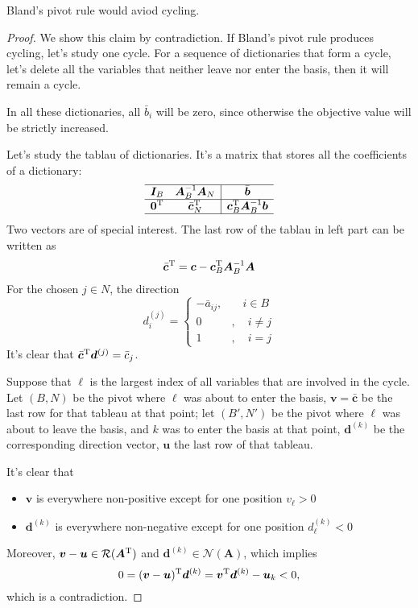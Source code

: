 \begin{theorem}
Bland's pivot rule would aviod cycling.
\end{theorem}
\begin{proof}
We show this claim by contradiction. If Bland's pivot rule produces cycling, let's study one cycle. For a sequence of dictionaries that form a cycle, let's delete all the variables that neither leave nor enter the basis, then it will remain a cycle.

In all these dictionaries, all $\bar{b}_i$ will be zero, since otherwise the objective value will be strictly increased.

Let's study the tablau of dictionaries. It's a matrix that stores all the coefficients of a dictionary:
\[
\begin{array}{cc|c}
\hline
  \bm I_B & \bm A_B^{-1}\bm A_N&\bar{\bm b} \\ \hline
  \bm 0^{\mathrm T}&\bar{\bm c}_N^{\mathrm T}&\bm c_B^{\mathrm T}\bm A_B^{-1}\bm b \\ \hline
\end{array}
\]
Two vectors are of special interest. The last row of the tablau in left part can be written as
\[
\bar{\bm c}^{\mathrm T}=\bm c - \bm c_B^{\mathrm T}\bm A_B^{-1}\bm A
\]
For the chosen $j\in N$, the direction
\[
d_i^{(j)} = \left\{
\begin{aligned}
-\bar{a}_{ij},&\quad i\in B\\
0&,\quad i\ne j\\
1&,\quad i=j
\end{aligned}
\right.
\]
It's clear that $\bar{\bm c}^{\mathrm T} \bm d^{(j)}=\bar{c}_j$.

Suppose that $\ell$ is the largest index of all variables that are involved in the cycle. Let $(B,N)$ be the pivot where $\ell$ was about to enter the basis, $\bm v=\bar{\bm c}$ be the last row for that tableau at that point; let $(B',N')$ be the pivot where $\ell$ was about to leave the basis, and $k$ was to enter the basis at that point, $\bm d^{(k)}$ be the corresponding direction vector, $\bm u$ the last row of that tableau.

It's clear that 
\begin{itemize}
\item
$\bm v$ is everywhere non-positive except for one position $v_\ell>0$
\item
$\bm d^{(k)}$ is everywhere non-negative except for one position $d_\ell^{(k)}<0$
\end{itemize}
Moreover, $\bm v-\bm u\in\mathcal{R}(\bm A^{\mathrm T})$ and $\bm d^{(k)}\in\mathcal{N}(\bm A)$, which implies
\[
0 = (\bm v-\bm u)^{\mathrm T} \bm d^{(k)} = \bm v^{\mathrm T}\bm d^{(k)} - \bm u_k<0,
\]
which is a contradiction.
\end{proof}






















